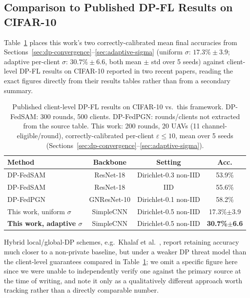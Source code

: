 \documentclass[12pt,a4paper]{article}
\begin{document}
\subsection{Comparison to Published DP-FL Results on CIFAR-10}
\label{sec:dpfl-comparison}

Table~\ref{tab:dpfl-comparison} places this work's two correctly-calibrated
mean final accuracies from Sections~\ref{sec:dp-convergence}--\ref{sec:adaptive-sigma}
(uniform $\sigma$: $17.3\%\pm3.9$; adaptive per-client $\sigma$: $30.7\%\pm6.6$,
both mean $\pm$ std over 5 seeds) against client-level DP-FL results on
CIFAR-10 reported in two recent papers, reading the exact figures directly
from their results tables rather than from a secondary summary.

\begin{table}[H]
  \centering
  \caption{Published client-level DP-FL results on CIFAR-10 vs.\ this
  framework. DP-FedSAM: 300 rounds, 500 clients. DP-FedPGN: rounds/clients
  not extracted from the source table. This work: 200 rounds, 20 UAVs
  (11 channel-eligible/round), correctly-calibrated per-client
  $\varepsilon\le10$, mean over 5 seeds (Sections~\ref{sec:dp-convergence}--\ref{sec:adaptive-sigma}).}
  \label{tab:dpfl-comparison}
  \begin{tabular}{lccc}
    \toprule
    Method & Backbone & Setting & Acc.\\
    \midrule
    DP-FedSAM~\cite{shi2023} & ResNet-18 & Dirichlet-0.3 non-IID & 53.9\%\\
    DP-FedSAM~\cite{shi2023} & ResNet-18 & IID & 55.6\%\\
    DP-FedPGN~\cite{liu2025} & GNResNet-10 & Dirichlet-0.1 non-IID & 58.2\%\\
    This work, uniform $\sigma$ & SimpleCNN & Dirichlet-0.5 non-IID & 17.3\%$\pm$3.9\\
    \textbf{This work, adaptive $\sigma$} & SimpleCNN & Dirichlet-0.5 non-IID & \textbf{30.7\%$\pm$6.6}\\
    \bottomrule
  \end{tabular}
\end{table}
Hybrid local/global-DP schemes, e.g.\ Khalaf et al.~\cite{khalaf2024}, report
retaining accuracy much closer to a non-private baseline, but under a weaker
DP threat model than the client-level guarantees compared in
Table~\ref{tab:dpfl-comparison}; we omit a specific figure here since we were
unable to independently verify one against the primary source at the time of
writing, and note it only as a qualitatively different approach worth
tracking rather than a directly comparable number.
\end{document}
